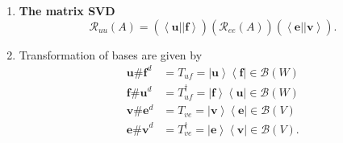 \documentclass[aps,preprint]{revtex4}%
\begin{document}
\begin{enumerate}
\begin{enumerate}
\item
\begin{align*}
A  &  =\left\vert \mathbf{u}\right\rangle \left\langle \mathbf{u}\right\vert
\left(  \overset{}{\left\vert \boldsymbol{f}\right\rangle \mathcal{R}%
_{ee}\left(  A\right)  \left\langle \boldsymbol{e}\right\vert }\right)
\left\vert \mathbf{v}\right\rangle \left\langle \mathbf{v}\right\vert \\
&  =\left\vert \mathbf{u}\right\rangle \left(  \overset{}{\left\langle
\mathbf{u}\right\vert \left(  \overset{}{\left\vert \boldsymbol{f}%
\right\rangle \mathcal{R}_{ee}\left(  A\right)  \left\langle \boldsymbol{e}%
\right\vert }\right)  \left\vert \mathbf{v}\right\rangle }\right)
\left\langle \mathbf{v}\right\vert \\
&  =\left\vert \mathbf{u}\right\rangle \mathcal{R}_{uu}\left(  A\right)
\left\langle \mathbf{v}\right\vert .
\end{align*}


\item
\begin{equation}
A=\left\vert \mathbf{u}\right\rangle \left(  \overset{}{\left\langle
\mathbf{u}\right\vert \left(  \overset{}{\left\vert \boldsymbol{f}%
\right\rangle \mathcal{R}_{ee}\left(  A\right)  \left\langle \boldsymbol{e}%
\right\vert }\right)  \left\vert \mathbf{v}\right\rangle }\right)
\left\langle \mathbf{v}\right\vert =
\end{equation}

\end{enumerate}

\item \textbf{The matrix SVD \label{The matrix SVD} }%
\[
\mathcal{R}_{uu}\left(  A\right)  =\left(  \overset{}{\left\langle
\mathbf{u}\right\vert \left\vert \boldsymbol{f}\right\rangle }\right)  \left(
\overset{}{\mathcal{R}_{ee}\left(  A\right)  }\right)  \left(
\overset{}{\left\langle \boldsymbol{e}\right\vert \left\vert \mathbf{v}%
\right\rangle }\right)  .
\]


\item Transformation of bases are given by
\begin{align*}
\mathbf{u\#}\boldsymbol{f}^{d}  &  =T_{uf}=\left\vert \mathbf{u}\right\rangle
\left\langle \boldsymbol{f}\right\vert \in\mathcal{B}\left(  W\right) \\
\boldsymbol{f}\mathbf{\#}\boldsymbol{u}^{d}  &  =T_{uf}^{\dagger}=\left\vert
\boldsymbol{f}\right\rangle \left\langle \mathbf{u}\right\vert \in
\mathcal{B}\left(  W\right) \\
\mathbf{v\#}\boldsymbol{e}^{d}  &  =T_{ve}=\left\vert \mathbf{v}\right\rangle
\left\langle \boldsymbol{e}\right\vert \in\mathcal{B}\left(  V\right) \\
\boldsymbol{e}\mathbf{\#v}^{d}  &  =T_{ve}^{\dagger}=\left\vert \boldsymbol{e}%
\right\rangle \left\langle \mathbf{v}\right\vert \in\mathcal{B}\left(
V\right)  .
\end{align*}



\end{enumerate}
\end{document}
